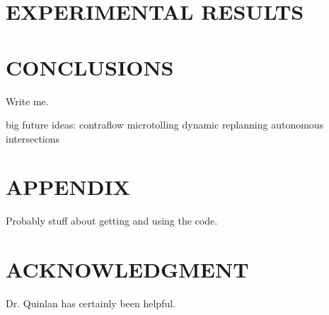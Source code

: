 \documentclass[letterpaper, 10 pt, conference]{ieeeconf}  %
\begin{document}
\section{EXPERIMENTAL RESULTS}



\section{CONCLUSIONS}

Write me.

big future ideas:
  contraflow
  microtolling
  dynamic replanning
    autonomous intersections

\addtolength{\textheight}{-12cm}  %


\section*{APPENDIX}

Probably stuff about getting and using the code.

\section*{ACKNOWLEDGMENT}

Dr. Quinlan has certainly been helpful.








\end{document}
